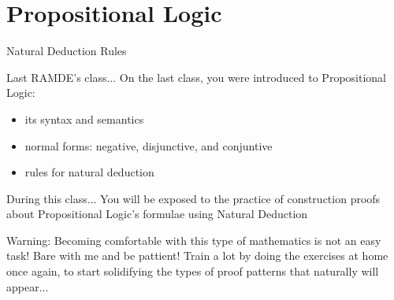 \documentclass[aspectratio=169]{beamer}
\begin{document}
\frame[plain]{\titlepage}


\section{Propositional Logic }

\begin{slide}{Natural Deduction Rules}
\small

\begin{block}{Last RAMDE's class...}
  On the last class, you were introduced to Propositional Logic:
  \begin{itemize}
    \item its syntax and semantics
    \item normal forms: negative, disjunctive, and conjuntive
    \item rules for natural deduction
  \end{itemize}
\end{block}

\begin{block}{During this class...}
You will be exposed to the practice of construction proofs about Propositional Logic's formulae using Natural Deduction  
\end{block}


\begin{alert}{Warning:}
Becoming comfortable with this type of mathematics is not an easy task! Bare with me and be pattient! Train a lot by doing the exercises at home once again, to start solidifying the types of proof patterns that naturally will appear...
\end{alert}

\end{slide}
\end{document}
